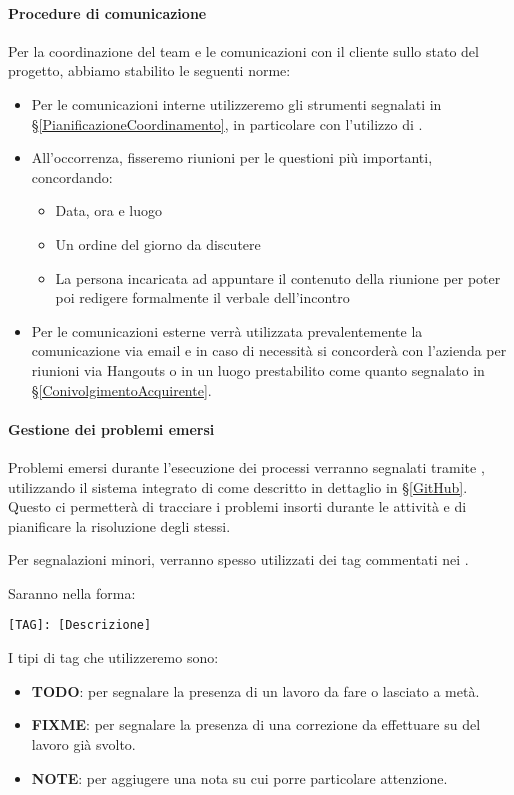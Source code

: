 			\paragraph{Procedure di comunicazione}
			Per la coordinazione del team e le comunicazioni con il cliente sullo stato del progetto, abbiamo stabilito le seguenti norme:
			\begin{itemize}
				\item Per le comunicazioni interne utilizzeremo gli strumenti segnalati in \S\ref{PianificazioneCoordinamento},
					in particolare con l'utilizzo di .
				\item All'occorrenza, fisseremo riunioni per le questioni più importanti, concordando:
					\begin{itemize}
						\item Data, ora e luogo
						\item Un ordine del giorno da discutere
						\item La persona incaricata ad appuntare il contenuto della riunione per poter poi redigere formalmente il verbale dell'incontro
					\end{itemize}
				\item Per le comunicazioni esterne verrà utilizzata prevalentemente la comunicazione via email e in caso di necessità si concorderà con l'azienda per riunioni via Hangouts o in un luogo prestabilito come quanto segnalato in \S\ref{ConivolgimentoAcquirente}.
			\end{itemize}


    		\paragraph{Gestione dei problemi emersi}
			Problemi emersi durante l'esecuzione dei processi verranno segnalati tramite , utilizzando il sistema integrato di
			 come descritto in dettaglio in \S\ref{GitHub}. Questo ci permetterà di tracciare i problemi insorti durante le attività
			e di pianificare la risoluzione degli stessi.\par
			Per segnalazioni minori, verranno spesso utilizzati dei tag commentati nei .
			\begin{samepage}
				Saranno nella forma:
				\begin{center}
					\texttt{[TAG]: [Descrizione]}
				\end{center}
			\end{samepage}
			I tipi di tag che utilizzeremo sono:
			\begin{itemize}
				\item \textbf{TODO}: per segnalare la presenza di un lavoro da fare o lasciato a metà.
				\item \textbf{FIXME}: per segnalare la presenza di una correzione da effettuare su del lavoro già svolto.
				\item \textbf{NOTE}: per aggiugere una nota su cui porre particolare attenzione.
			\end{itemize}

